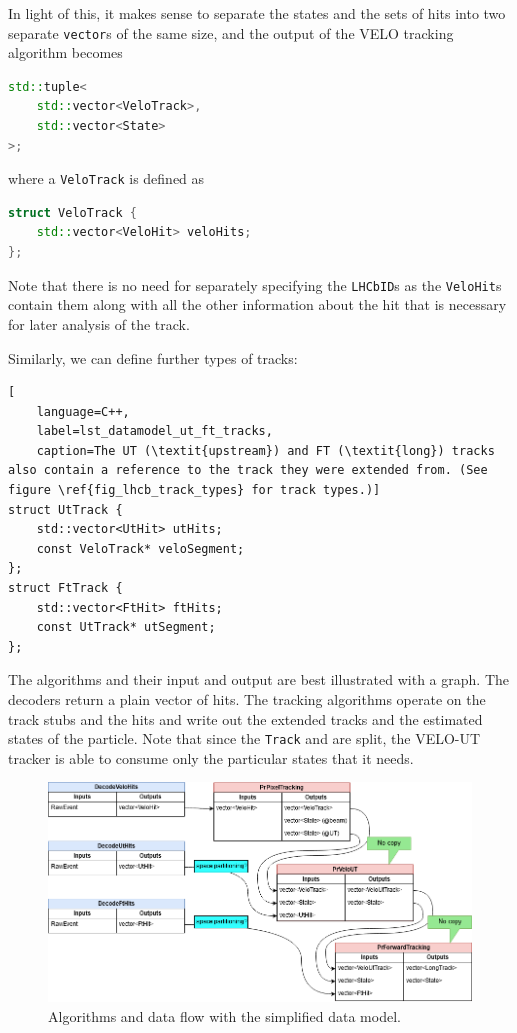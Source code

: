\documentclass[12pt]{article}
\newcommand{\code}[1]{\texttt{#1}}
\begin{document}
In light of this, it makes sense to separate the states and the sets of hits into two separate \code{vector}s of the same size, and the output of the VELO tracking algorithm becomes
\begin{lstlisting}[language=C++]
std::tuple<
	std::vector<VeloTrack>,
	std::vector<State>
>;
\end{lstlisting}
where a \code{VeloTrack} is defined as 
\begin{lstlisting}[language=C++]
struct VeloTrack {
	std::vector<VeloHit> veloHits;
};
\end{lstlisting}

Note that there is no need for separately specifying the \code{LHCbID}s as the \code{VeloHit}s contain them along with all the other information about the hit that is necessary for later analysis of the track.

\vspace{1pc}

Similarly, we can define further types of tracks:
\begin{lstlisting}[
	language=C++,
	label=lst_datamodel_ut_ft_tracks,
	caption=The UT (\textit{upstream}) and FT (\textit{long}) tracks also contain a reference to the track they were extended from. (See figure \ref{fig_lhcb_track_types} for track types.)]
struct UtTrack {
	std::vector<UtHit> utHits;
	const VeloTrack* veloSegment;
};
struct FtTrack {
	std::vector<FtHit> ftHits;
	const UtTrack* utSegment;
};
\end{lstlisting}

The algorithms and their input and output are best illustrated with a graph. The decoders return a plain vector of hits. The tracking algorithms operate on the track stubs and the hits and write out the extended tracks and the estimated states of the particle. Note that since the \code{Track} and are split, the VELO-UT tracker is able to consume only the particular states that it needs.

\begin{figure}[H]
	\begin{center}
		\includegraphics[width=1\textwidth]{datamodel_track_flow}
	\end{center}
	\caption{Algorithms and data flow with the simplified data model.}
	\label{fig_datamodel_track_flow}
\end{figure}
\end{document}
